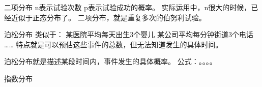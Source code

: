 二项分布
    n表示试验次数
    p表示试验成功的概率。
    实际运用中，n很大的时候，已经近似于正态分布了。
    二项分布，就是重复多次的伯努利试验。

泊松分布
    类似于：
        某医院平均每天出生3个婴儿
        某公司平均每分钟街道3个电话
        ……
    特点就是可以预估这些事件的总数，但无法知道发生的具体时间。

    泊松分布就是描述某段时间内，事件发生的具体概率。
    公式：。。。。

指数分布